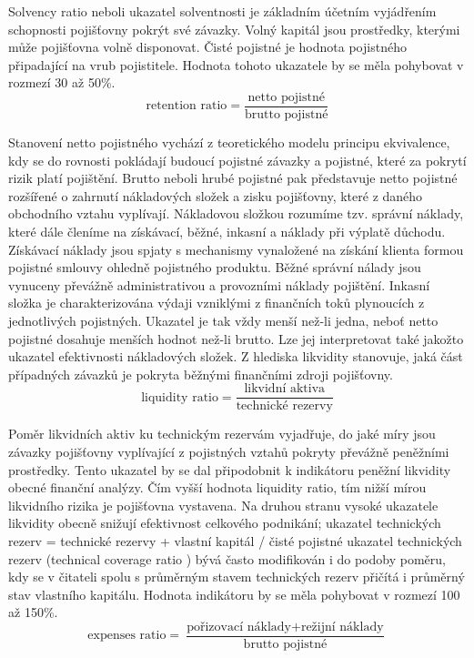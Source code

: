 \documentclass[12pt,oneside]{fithesis}
\begin{document}
Solvency ratio neboli ukazatel solventnosti je základním účetním vyjádřením schopnosti
pojišťovny pokrýt své závazky. Volný kapitál jsou prostředky, kterými může pojišťovna
volně disponovat. Čisté pojistné je hodnota pojistného připadající na vrub pojistitele. Hodnota tohoto ukazatele by se měla pohybovat v rozmezí 30 až 50\%.
\[
	\text{retention ratio} =\frac{\text{netto pojistné}}{\text{brutto pojistné}}
\]

Stanovení netto pojistného vychází z teoretického modelu principu ekvivalence, kdy se do
rovnosti pokládají budoucí pojistné závazky a pojistné, které za pokrytí rizik platí pojištění. Brutto neboli hrubé pojistné pak představuje netto pojistné rozšířené o zahrnutí nákladových složek a zisku pojišťovny, které z daného obchodního vztahu vyplívají. Nákladovou složkou rozumíme tzv. správní náklady, které dále členíme na získávací, běžné, inkasní a náklady při výplatě důchodu. Získávací náklady jsou spjaty s mechanismy vynaložené na získání klienta formou pojistné smlouvy ohledně pojistného produktu. Běžné správní nálady jsou vynuceny převážně administrativou a provozními náklady pojištění. Inkasní složka je charakterizována výdaji vzniklými z finančních toků plynoucích z jednotlivých pojistných. Ukazatel je tak vždy menší než-li jedna, neboť netto pojistné dosahuje menších hodnot než-li brutto. Lze jej interpretovat také jakožto ukazatel efektivnosti nákladových složek. Z hlediska likvidity stanovuje, jaká část případných závazků je pokryta běžnými finančními zdroji pojišťovny.
\[
	\text{liquidity ratio} =\frac{\text{likvidní aktiva}}{\text{technické rezervy}}
\]

Poměr likvidních aktiv ku technickým rezervám vyjadřuje, do jaké míry jsou závazky
pojišťovny vyplívající z pojistných vztahů pokryty převážně peněžními prostředky. Tento
ukazatel by se dal připodobnit k indikátoru peněžní likvidity obecné finanční analýzy. Čím
vyšší hodnota liquidity ratio, tím nižší mírou likvidního rizika je pojišťovna vystavena. Na druhou stranu vysoké ukazatele likvidity obecně snižují efektivnost celkového podnikání;
ukazatel technických rezerv = technické rezervy + vlastní kapitál / čisté pojistné
ukazatel technických rezerv (technical coverage ratio ) bývá často modifikován i do podoby
poměru, kdy se v čitateli spolu s průměrným stavem technických rezerv přičítá i průměrný
stav vlastního kapitálu. Hodnota indikátoru by se měla pohybovat v rozmezí 100 až 150\%.
\[
	\text{expenses ratio} =\frac{\text{pořizovací náklady} + \text{režijní náklady}}{\text{brutto pojistné}}
\]
\end{document}

